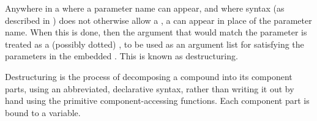 
Anywhere in a  where a parameter
name can appear, and where  syntax
(as described in \secref\OrdinaryLambdaLists) does not 
otherwise allow a , a  
can appear in place
of the parameter name.  When this is done, then the argument 
that would match the parameter is treated as a (possibly dotted) ,
to be used as an argument list for satisfying the
parameters in the embedded .
This is known as destructuring.
 


Destructuring is the process of decomposing a compound  into
its component parts, using an abbreviated, declarative syntax, rather
than writing it out by hand using the primitive component-accessing
functions.  Each component part is bound to a variable.
 
 
